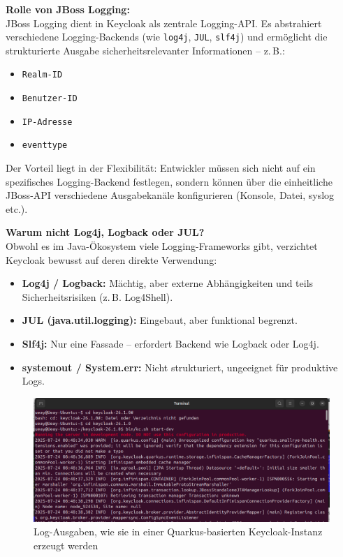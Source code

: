 \documentclass[a4paper,12pt]{article}
\begin{document}
	\vspace{0.5em}
	\textbf{Rolle von JBoss Logging:}\\
	JBoss Logging dient in Keycloak als zentrale Logging-API. Es abstrahiert verschiedene Logging-Backends (wie \texttt{\gls{log4j}}, \texttt{JUL}, \texttt{\gls{slf4j}}) und ermöglicht die strukturierte Ausgabe sicherheitsrelevanter Informationen – z.\,B.:
	\begin{itemize}
		\item \texttt{Realm-ID}
		\item \texttt{Benutzer-ID}
		\item \texttt{IP-Adresse}
		\item \texttt{\gls{eventtype}}
	\end{itemize}
	
	Der Vorteil liegt in der Flexibilität: Entwickler müssen sich nicht auf ein spezifisches Logging-Backend festlegen, sondern können über die einheitliche JBoss-API verschiedene Ausgabekanäle konfigurieren (Konsole, Datei, \gls{syslog} etc.).
	
	\vspace{0.5em}
	\textbf{Warum nicht Log4j, Logback oder JUL?}\\
	Obwohl es im Java-Ökosystem viele Logging-Frameworks gibt, verzichtet Keycloak bewusst auf deren direkte Verwendung:
	\begin{itemize}
		\item \textbf{Log4j / Logback:} Mächtig, aber externe Abhängigkeiten und teils Sicherheitsrisiken (z.\,B. Log4Shell).
		\item \textbf{JUL (java.util.logging):} Eingebaut, aber funktional begrenzt.
		\item \textbf{Slf4j:} Nur eine Fassade – erfordert Backend wie Logback oder Log4j.
		\item \textbf{\gls{systemout} / System.err:} Nicht strukturiert, ungeeignet für produktive Logs.
	\end{itemize}
	
	\begin{figure}[H]
		\centering
		\includegraphics[width=1.1\linewidth]{screenshot014}
		\caption{Log-Ausgaben, wie sie in einer Quarkus-basierten Keycloak-Instanz erzeugt werden}
		\label{fig:screenshot014}
	\end{figure}
	
\end{document}
